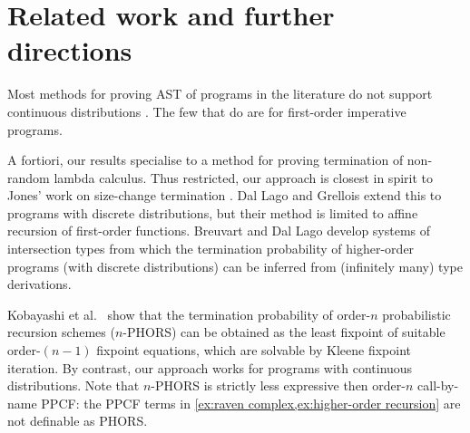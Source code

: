 \section{Related work and further directions}
\label{sec:related}

 

Most methods for proving AST of programs in the literature do not support continuous distributions \cite{DBLP:journals/toplas/LagoG19,DBLP:journals/jacm/KaminskiKMO18,DBLP:conf/lics/OlmedoKKM16,DBLP:conf/lics/KobayashiLG19,DBLP:conf/mfcs/KaminskiK15,DBLP:series/mcs/McIverM05}.
The few that do \cite{DBLP:conf/popl/FioritiH15,DBLP:conf/pldi/ChenH20,DBLP:journals/toplas/ChatterjeeFNH18} are for first-order imperative programs.

A fortiori, our results specialise to a method for proving termination of non-random lambda calculus. 
Thus restricted, our approach is closest in spirit to Jones' work on size-change termination \cite{DBLP:journals/lmcs/JonesB08,DBLP:conf/aplas/SereniJ05}. 
Dal Lago and Grellois \cite{DBLP:journals/toplas/LagoG19} extend this to programs with discrete distributions, but their method is limited to affine recursion of first-order functions.
Breuvart and Dal Lago \cite{DBLP:conf/ppdp/BreuvartL18} develop systems of intersection types from which the termination probability of higher-order programs (with discrete distributions) can be inferred from (infinitely many) type derivations. 

Kobayashi et al.~\cite{DBLP:conf/lics/KobayashiLG19} show that the termination probability of order-$n$ probabilistic recursion schemes ($n$-PHORS) can be obtained as the least fixpoint of suitable order-$(n-1)$ fixpoint equations, which are solvable by Kleene fixpoint iteration.  
By contrast, our approach works for programs with continuous distributions. 
Note that $n$-PHORS is strictly less expressive then order-$n$ call-by-name PPCF:
the PPCF terms in \cref{ex:raven complex,ex:higher-order recursion}
are not definable as PHORS.

